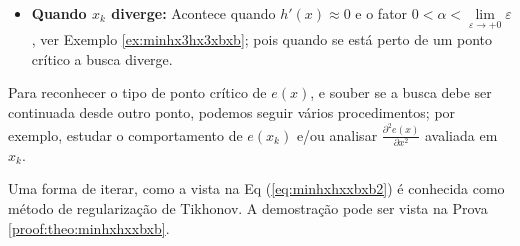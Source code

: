 \begin{theorem}
\begin{itemize}
\item \textbf{Quando $x_{k}$ diverge:}  
Acontece quando $h'(x) \approx 0$ e o fator $0<\alpha<\lim\limits_{\varepsilon \rightarrow +0}\varepsilon$, 
ver Exemplo \ref{ex:minhx3hx3xbxb}; pois quando se está perto
de um ponto crítico a busca diverge. \\
\end{itemize}

Para reconhecer o tipo de ponto crítico de $e(x)$, e souber se 
a busca debe ser continuada desde outro ponto, 
podemos seguir vários procedimentos; por exemplo, estudar o comportamento 
de $e(x_k)$ e/ou analisar  $\frac{\partial^2 e(x)}{\partial x^2}$ avaliada em $x_k$.

Uma forma de iterar, como a vista na Eq (\ref{eq:minhxhxxbxb2}) é conhecida como 
método de regularização de Tikhonov.
A demostração pode ser vista na Prova \ref{proof:theo:minhxhxxbxb}.
\end{theorem}




